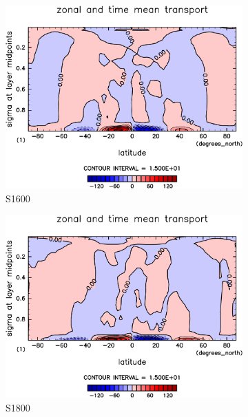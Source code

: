 \documentclass[body]{subfiles}
\begin{document}
\begin{figure}[t]
\begin{subfigure}{.4\textwidth}
		\centering
		\includegraphics[width=\columnwidth]{S1600/MeriHeatTransTest@latentEn_M,time=3650:4015-crop-rotate.pdf}
		\caption{S1600}\label{潜熱平均子午面循環S1600}
	\end{subfigure}
	\begin{subfigure}{.4\textwidth}
		\centering
		\includegraphics[width=\columnwidth]{S1800/MeriHeatTransTest@latentEn_M,time=3650:4015-crop-rotate.pdf}
		\caption{S1800}\label{潜熱平均子午面循環S1800}
	\end{subfigure}
	\begin{subfigure}{.4\textwidth}
		\centering

\end{subfigure}
\end{figure}
\end{document}
